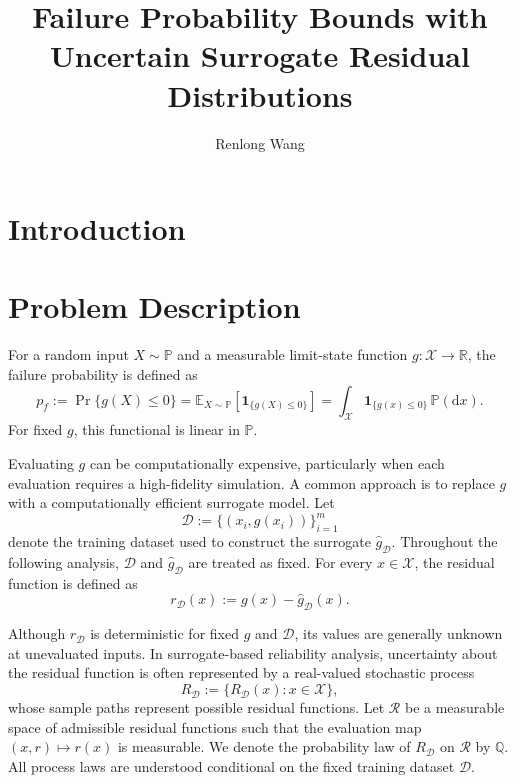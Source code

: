 \documentclass[review,11pt,3p,authoryear,nopreprintline]{elsarticle}
\begin{document}
\begin{frontmatter}
\title{Failure Probability Bounds with Uncertain Surrogate Residual Distributions}

\author[inst1]{Renlong Wang}

\begin{abstract}
\end{abstract}

\begin{keyword}
\end{keyword}
\end{frontmatter}

\section{Introduction}

\section{Problem Description}
\label{sec-problem}

For a random input $X\sim\mathbb{P}$ and a measurable limit-state function $g:\mathcal{X}\to\mathbb{R}$, the failure probability is defined as
\[
  p_f
  := \Pr\{g(X)\leq 0\}
  = \mathbb{E}_{X\sim\mathbb{P}} \left[\mathbf{1}_{\{g(X)\leq 0\}}\right]
  = \int_{\mathcal{X}}
    \mathbf{1}_{\{g(x)\leq 0\}}\,\mathbb{P}(\mathrm{d}x).
\]
For fixed $g$, this functional is linear in $\mathbb{P}$.

Evaluating $g$ can be computationally expensive, particularly when each evaluation requires a high-fidelity simulation. A common approach is to replace $g$ with a computationally
efficient surrogate model. Let
\[
  \mathcal{D}
  := \{(x_i,g(x_i))\}_{i=1}^{m}
\]
denote the training dataset used to construct the surrogate $\hat{g}_{\mathcal{D}}$. Throughout the following analysis, $\mathcal{D}$ and $\hat{g}_{\mathcal{D}}$ are treated as fixed. For every $x\in\mathcal{X}$, the residual function is defined as
\[
  r_{\mathcal{D}}(x)
  := g(x)-\hat{g}_{\mathcal{D}}(x) .
\]

Although $r_{\mathcal{D}}$ is deterministic for fixed $g$ and $\mathcal{D}$, its values are generally unknown at unevaluated inputs. In surrogate-based reliability analysis, uncertainty about the residual function is often represented by a real-valued stochastic process
\[
  R_{\mathcal{D}}
  := \{R_{\mathcal{D}}(x):x\in\mathcal{X}\},
\]
whose sample paths represent possible residual functions. Let $\mathcal{R}$ be a measurable space of admissible residual functions such that the evaluation map $(x,r)\mapsto r(x)$ is measurable. We denote the probability law of $R_{\mathcal{D}}$ on $\mathcal{R}$ by $\mathbb{Q}$. All process laws are understood conditional on the fixed training dataset $\mathcal{D}$.
\end{document}

